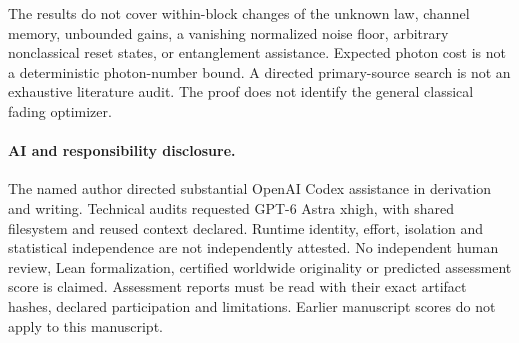 \documentclass[11pt]{article}
\begin{document}
The results do not cover within-block changes of the unknown law,
channel memory, unbounded gains, a vanishing normalized noise floor,
arbitrary nonclassical reset states, or entanglement assistance.
Expected photon cost is not a deterministic photon-number bound.
A directed primary-source search is not an exhaustive literature audit.
The proof does not identify the general classical fading optimizer.

\paragraph{AI and responsibility disclosure.}
The named author directed substantial OpenAI Codex assistance in
derivation and writing. Technical audits requested GPT-6 Astra xhigh,
with shared filesystem and reused context declared.
Runtime identity, effort, isolation and statistical independence are
not independently attested. No independent human review, Lean
formalization, certified worldwide originality or predicted assessment
score is claimed. Assessment reports must be read with their exact
artifact hashes, declared participation and limitations. Earlier
manuscript scores do not apply to this manuscript.
\end{document}
